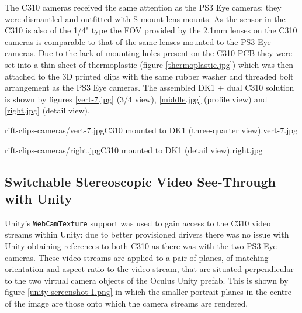 The C310 cameras received the same attention as the PS3 Eye cameras: they were dismantled and outfitted with S-mount lens mounts. As the sensor in the C310 is also of the 1/4" type the FOV provided by the 2.1mm lenses on the C310 cameras is comparable to that of the same lenses mounted to the PS3 Eye cameras. Due to the lack of mounting holes present on the C310 PCB they were set into a thin sheet of thermoplastic (figure \ref{thermoplastic.jpg}) which was then attached to the 3D printed clips with the same rubber washer and threaded bolt arrangement as the PS3 Eye cameras. The assembled DK1 + dual C310 solution is shown by figures \ref{vert-7.jpg} (3/4 view), \ref{middle.jpg} (profile view) and \ref{right.jpg} (detail view).

       {rift-clips-cameras/vert-7.jpg}{C310 mounted to DK1 (three-quarter view).}{vert-7.jpg}

       {rift-clips-cameras/right.jpg}{C310 mounted to DK1 (detail view).}{right.jpg}


\subsection{Switchable Stereoscopic Video See-Through with Unity}

Unity's \texttt{WebCamTexture} support was used to gain access to the C310 video streams within Unity: due to better provisioned drivers there was no issue with Unity obtaining references to both C310 as there was with the two PS3 Eye cameras. These video streams are applied to a pair of planes, of matching orientation and aspect ratio to the video stream, that are situated perpendicular to the two virtual camera objects of the Oculus Unity prefab. This is shown by figure \ref{unity-screenshot-1.png} in which the smaller portrait planes in the centre of the image are those onto which the camera streams are rendered.

